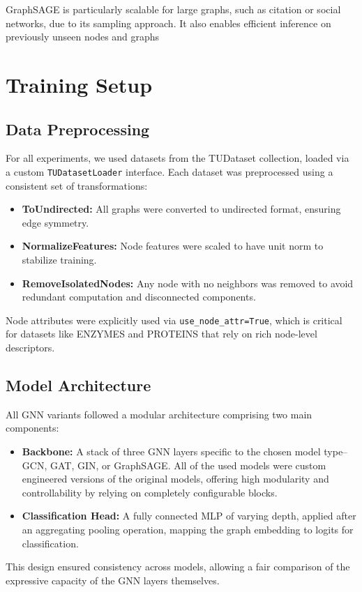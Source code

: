 \documentclass[11pt,a4paper]{article}
\begin{document}
	GraphSAGE is particularly scalable for large graphs, such as citation or social networks, due to its sampling approach. It also enables efficient inference on previously unseen nodes and graphs
	
	\section{Training Setup}
	
	\subsection{Data Preprocessing}
	
	For all experiments, we used datasets from the TUDataset collection, loaded via a custom \texttt{TUDatasetLoader} interface. Each dataset was preprocessed using a consistent set of transformations:
	\begin{itemize}
		\item \textbf{ToUndirected:} All graphs were converted to undirected format, ensuring edge symmetry.
		\item \textbf{NormalizeFeatures:} Node features were scaled to have unit norm to stabilize training.
		\item \textbf{RemoveIsolatedNodes:} Any node with no neighbors was removed to avoid redundant computation and disconnected components.
	\end{itemize}
	Node attributes were explicitly used via \texttt{use\_node\_attr=True}, which is critical for datasets like ENZYMES and PROTEINS that rely on rich node-level descriptors.
	
	\subsection{Model Architecture}
	
	All GNN variants followed a modular architecture comprising two main components:
	\begin{itemize}
		\item \textbf{Backbone:} A stack of three GNN layers specific to the chosen model type--GCN, GAT, GIN, or GraphSAGE. All of the used models were custom engineered versions of the original models, offering high modularity and controllability by relying on completely configurable blocks.
		\item \textbf{Classification Head:} A fully connected MLP of varying depth, applied after an aggregating pooling operation, mapping the graph embedding to logits for classification.
	\end{itemize}
	This design ensured consistency across models, allowing a fair comparison of the expressive capacity of the GNN layers themselves.
	
\end{document}
